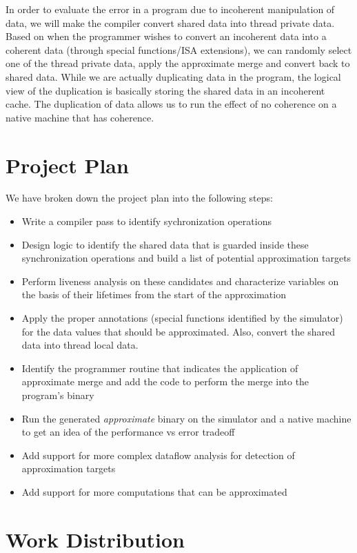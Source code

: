 \documentclass[12pt,conference]{IEEEtran}
\begin{document}
In order to evaluate the error in a program due to incoherent 
manipulation of data, we will make the compiler convert 
shared data into thread private data. Based on when the programmer
wishes to convert an incoherent data into a coherent data (through 
special functions/ISA extensions), we can randomly select one
of the thread private data, apply the approximate merge and convert
back to shared data. While we are actually duplicating data in 
the program, the logical view of the duplication is basically
storing the shared data in an incoherent cache. The duplication of data
allows us to run the effect of no coherence on a native machine
that has coherence.


\section{Project Plan}

We have broken down the project plan into the following steps:

\begin{itemize}

\item Write a compiler pass to identify sychronization operations
\item Design logic to identify the shared data that is guarded inside
these synchronization operations and build a list of potential approximation
targets
\item Perform liveness analysis on these candidates and characterize 
variables on the basis of their lifetimes from the start of the approximation
\item Apply the proper annotations (special functions identified by the simulator)
for the data values that should be approximated. Also, convert the shared data
into thread local data.
\item Identify the programmer routine that indicates the application of 
approximate merge and add the code to perform the merge into the program's binary
\item Run the generated \emph{approximate} binary on the simulator and a native machine to get 
an idea of the performance vs error tradeoff
\item Add support for more complex dataflow analysis for detection 
of approximation targets
\item Add support for more computations that can be approximated

\end{itemize}

\section{Work Distribution}
\end{document}
